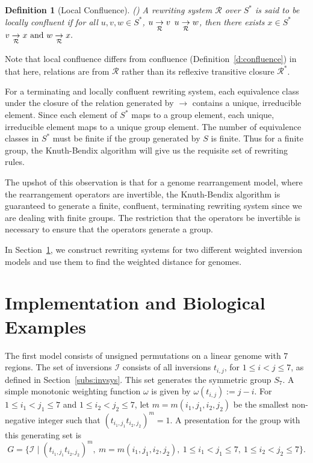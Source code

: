 \documentclass[utf8]{Frontiers_LaTex_Templates/frontiersFPHY} %
\newcommand{\invset}{\mathcal{I}}
\newcommand{\rws}{\mathcal{R}}
\newcommand{\writesto}{\rightarrow}
\newcommand{\writestoc}[1]{\underset{\mathclap{#1}}{\rightarrow}}
\numberwithin{equation}{section}
\newtheorem{definition}[prop]{Definition}
\begin{document}
\begin{definition}[Local Confluence](\cite{baader1999term})
A rewriting system $\rws$ over $S^*$ is said to be \emph{locally confluent}  if 
 for all  $u,v, w \in S^*$, 
$u \writestoc{\rws} v$  
$u \writestoc{\rws} w$,
{ then there exists }
$ x \in S^*$  $v \writestoc{\rws} x \mbox{ and } w \writestoc{\rws} x.$
\end{definition}

Note that local confluence differs from confluence (Definition~\ref{d:confluence}) in that here, relations are from $\rws$ rather than its reflexive transitive closure $\rws^*$.


For a terminating and locally confluent rewriting system,  each equivalence class under the closure of the relation generated by $\writesto$ contains a unique, irreducible element.  
%
Since each element of $S^*$ maps to a group element, each unique, irreducible element maps to a unique group element. The number of equivalence classes in $S^*$ must be finite if the group generated by $S$ is finite. Thus for a finite group, the Knuth-Bendix algorithm will give us the requisite set of rewriting rules. 

The upshot of this observation is that for a genome rearrangement model, where the rearrangement operators are invertible, the Knuth-Bendix algorithm is guaranteed to generate a finite, confluent, terminating  rewriting system since we are dealing with finite groups. The restriction that the operators be invertible is necessary to ensure that the operators generate a group. 

In Section~\ref{sec:examples}, we construct rewriting systems for two different weighted inversion models and use them to find the weighted distance for genomes. 

\section{Implementation and Biological Examples}
\label{sec:examples}
The first model consists of unsigned permutations on a linear genome with $7$ regions. The set of inversions $\invset$ consists of all inversions $t_{i,j}$, for $1 \leq i < j \leq 7$, as defined in Section~\ref{subs:invsys}. This set generates the symmetric group $S_7$. A simple monotonic weighting function $\omega$ is given by $\omega(t_{i,j}) := j - i$.
For $1\leq i_1 < j_1\leq 7$ and  $1\leq i_2 < j_2\leq 7$, let $m=m(i_1, j_1, i_2, j_2)$ be the smallest non-negative integer such that $(t_{i_1,j_1} t_{i_2,j_2})^m = 1$.
 A presentation for the group with this generating set is
\[
G = \{ \invset \mid (t_{i_1,j_1}t_{i_2,j_2})^{m},\ m=m(i_1, j_1, i_2, j_2),\ 1\le i_1 < j_1 \le 7,\ 1\le i_2 < j_2 \le 7 \}.
\]
\end{document}
